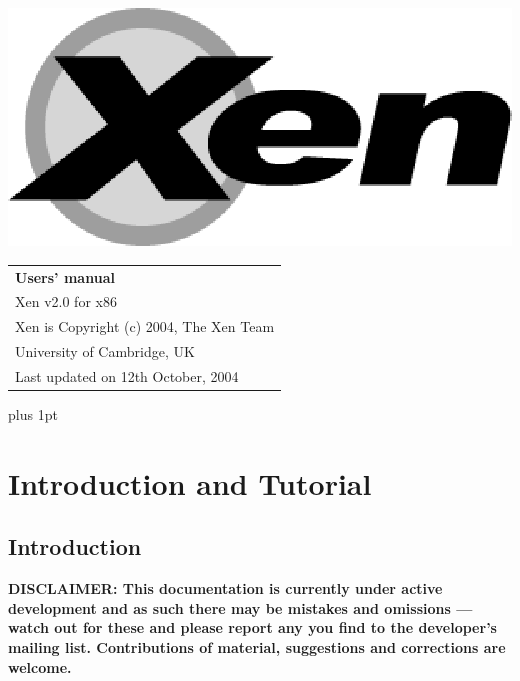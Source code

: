 \documentclass[11pt,twoside,final,openright]{xenstyle}
\begin{document}
\pagestyle{empty}
\begin{center}
\vspace*{\fill}
\includegraphics{figs/xenlogo.eps}
\vfill
\vfill
\vfill
\begin{tabular}{l}
{\Huge \bf Users' manual} \\[4mm]
{\huge Xen v2.0 for x86} \\[80mm]

{\Large Xen is Copyright (c) 2004, The Xen Team} \\[3mm]
{\Large University of Cambridge, UK} \\[20mm]
{\large Last updated on 12th October, 2004}
\end{tabular}
\vfill
\end{center}
\cleardoublepage

\pagestyle{plain}
{ \parskip 0pt plus 1pt
  \tableofcontents }
\cleardoublepage

\raggedbottom
{}
\parindent=0pt
\renewcommand{\topfraction}{.8}
\renewcommand{\bottomfraction}{.8}
\renewcommand{\textfraction}{.2}
\renewcommand{\floatpagefraction}{.8}

\newcommand{\path}[1]{{\tt #1}}

\part{Introduction and Tutorial}
\chapter{Introduction}

{\bf
DISCLAIMER: This documentation is currently under active development
and as such there may be mistakes and omissions --- watch out for
these and please report any you find to the developer's mailing list.
Contributions of material, suggestions and corrections are welcome.
}
\end{document}
